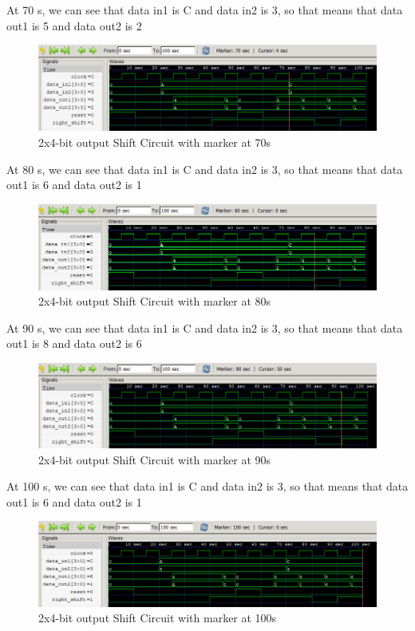 \documentclass[12pt]{article}
\begin{document}
At 70 s, we can see that data in1 is C and data in2 is 3, so that means that data out1 is 5 and data out2 is 2
\begin{figure}[h]
    \centering
    \includegraphics[width = 1.0\textwidth]{figs/Shift70.png}
    \caption{2x4-bit output Shift Circuit with marker at 70s}
    \label{fig:enter-label}
\end{figure}

\newpage

At 80 s, we can see that data in1 is C and data in2 is 3, so that means that data out1 is 6 and data out2 is 1
\begin{figure}[h]
    \centering
    \includegraphics[width = 1.0\textwidth]{figs/Shift80.png}
    \caption{2x4-bit output Shift Circuit with marker at 80s}
    \label{fig:enter-label}
\end{figure}


At 90 s, we can see that data in1 is C and data in2 is 3, so that means that data out1 is 8 and data out2 is 6
\begin{figure}[h]
    \centering
    \includegraphics[width = 1.0\textwidth]{figs/Shift90.png}
    \caption{2x4-bit output Shift Circuit with marker at 90s}
    \label{fig:enter-label}
\end{figure}

At 100 s, we can see that data in1 is C and data in2 is 3, so that means that data out1 is 6 and data out2 is 1
\begin{figure}[h]
    \centering
    \includegraphics[width = 1.0\textwidth]{figs/Shift100.png}
    \caption{2x4-bit output Shift Circuit with marker at 100s}
    \label{fig:enter-label}
\end{figure}
\end{document}
